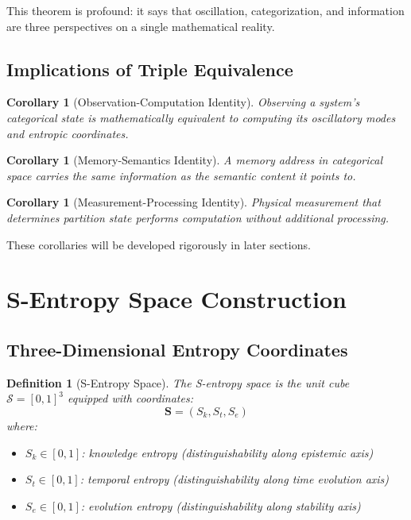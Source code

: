 \documentclass[twocolumn,10pt]{article}
\newtheorem{corollary}[theorem]{Corollary}
\newtheorem{definition}{Definition}
\begin{document}
This theorem is profound: it says that oscillation, categorization, and information are three perspectives on a single mathematical reality.

\subsection{Implications of Triple Equivalence}

\begin{corollary}[Observation-Computation Identity]
Observing a system's categorical state is mathematically equivalent to computing its oscillatory modes and entropic coordinates.
\end{corollary}

\begin{corollary}[Memory-Semantics Identity]
A memory address in categorical space carries the same information as the semantic content it points to.
\end{corollary}

\begin{corollary}[Measurement-Processing Identity]
Physical measurement that determines partition state performs computation without additional processing.
\end{corollary}

These corollaries will be developed rigorously in later sections.

\section{S-Entropy Space Construction}

\subsection{Three-Dimensional Entropy Coordinates}

\begin{definition}[S-Entropy Space]
The S-entropy space is the unit cube $\mathcal{S} = [0,1]^3$ equipped with coordinates:
\begin{equation}
\mathbf{S} = (S_k, S_t, S_e)
\end{equation}
where:
\begin{itemize}
\item $S_k \in [0,1]$: knowledge entropy (distinguishability along epistemic axis)
\item $S_t \in [0,1]$: temporal entropy (distinguishability along time evolution axis)
\item $S_e \in [0,1]$: evolution entropy (distinguishability along stability axis)
\end{itemize}
\end{definition}
\end{document}
